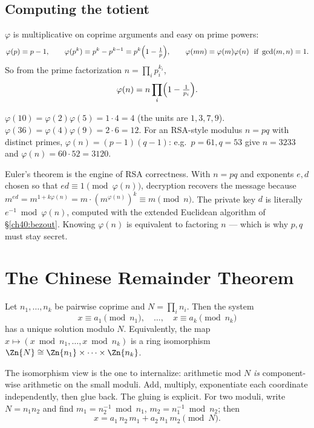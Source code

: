 \subsection{Computing the totient}
\label{ch40:totient}

$\varphi$ is multiplicative on coprime arguments and easy on prime powers:
\[
  \varphi(p) = p-1,\qquad
  \varphi(p^k) = p^k - p^{k-1} = p^{k}\Bigl(1-\tfrac1p\Bigr),\qquad
  \varphi(mn) = \varphi(m)\varphi(n)\ \text{ if } \gcd(m,n)=1.
\]
So from the prime factorization $n = \prod_i p_i^{k_i}$,
\[
  \varphi(n) = n\prod_{i}\Bigl(1 - \tfrac{1}{p_i}\Bigr).
\]

\begin{example}
\label{ch40:ex-totient}
$\varphi(10)=\varphi(2)\varphi(5)=1\cdot 4 = 4$ (the units are $1,3,7,9$). $\varphi(36)=\varphi(4)
\varphi(9)=2\cdot 6 = 12$. For an RSA-style modulus $n=pq$ with distinct primes, $\varphi(n) =
(p-1)(q-1)$: e.g.\ $p=61,q=53$ give $n=3233$ and $\varphi(n)=60\cdot 52 = 3120$.
\end{example}

\begin{applicationbox}
Euler's theorem is the engine of RSA correctness. With $n=pq$ and exponents $e,d$ chosen so that
$ed\equiv 1\pmod{\varphi(n)}$, decryption recovers the message because $m^{ed} = m^{1 + k\varphi(n)}
= m\cdot(m^{\varphi(n)})^k \equiv m\pmod n$. The private key $d$ is literally $e^{-1}\bmod
\varphi(n)$, computed with the extended Euclidean algorithm of \S\ref{ch40:bezout}. Knowing
$\varphi(n)$ is equivalent to factoring $n$ --- which is why $p,q$ must stay secret.
\end{applicationbox}

\section{The Chinese Remainder Theorem}
\label{ch40:crt}

\begin{theorem}[CRT]
\label{ch40:thm-crt}
Let $n_1,\dots,n_k$ be pairwise coprime and $N = \prod_i n_i$. Then the system
\[
  x \equiv a_1 \pmod{n_1},\quad \dots,\quad x \equiv a_k \pmod{n_k}
\]
has a unique solution modulo $N$. Equivalently, the map $x \mapsto (x\bmod n_1,\dots,x\bmod n_k)$ is
a ring isomorphism $\Zn{N} \cong \Zn{n_1}\times\cdots\times\Zn{n_k}$.
\end{theorem}

The isomorphism view is the one to internalize: arithmetic mod $N$ \emph{is} component-wise
arithmetic on the small moduli. Add, multiply, exponentiate each coordinate independently, then glue
back. The gluing is explicit. For two moduli, write $N=n_1 n_2$ and find $m_1 = n_2^{-1}\bmod n_1$,
$m_2 = n_1^{-1}\bmod n_2$; then
\[
  x = a_1\, n_2\, m_1 + a_2\, n_1\, m_2 \pmod N.
\]

